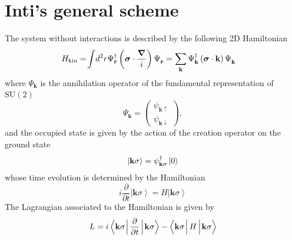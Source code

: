\documentclass[english,aps,prd,nofootinbib,twocolumn]{revtex4-1}
\begin{document}
\section{Inti's general scheme}
The system without interactions is described by the following 2D Hamiltonian
\begin{equation}
\begin{split}
H_{\mathrm{kin}} &= \!
\int \! d^{2}r 
\Psi_{\mathbf{r}}^{\textcolor{black}{\dagger}}
\left( 
\boldsymbol{\sigma}\cdot \frac{\boldsymbol{\nabla}}{i}
\right)
\Psi_{\mathbf{r}}^{\textcolor{white}{\dagger}}
=
\sum_{\mathbf{k}} 
\Psi_{\mathbf{k}}^{\textcolor{black}{\dagger}}
\left(
\boldsymbol{\sigma}\cdot \mathbf{k}
\right)
\Psi_{\mathbf{k}}^{\textcolor{white}{\dagger}}
\end{split}
\end{equation}
where $\Psi_{\mathbf{k}}$ is the annihilation operator of the fundamental representation of $\mathrm{SU(2)}$
\begin{equation}
\Psi_{\mathbf{k}} = 
\begin{pmatrix}
\psi_{\mathbf{k}\uparrow } \\
\psi_{\mathbf{k}\downarrow }
\end{pmatrix},
\end{equation}
and the occupied state is given by the action of the creation operator on the ground state
\begin{equation}
\left| 
\mathbf{k}\sigma 
\right\rangle = 
\psi_{\mathbf{k}\sigma}^{\textcolor{black}{\dagger}}
\left| 0 \right\rangle
\end{equation}
whose time evolution is determined by the Hamiltonian
\begin{equation}
i\frac{\partial}{\partial t}
\left| 
\mathbf{k}\sigma 
\right\rangle = 
H \left| 
\mathbf{k}\sigma 
\right\rangle 
\end{equation}
The Lagrangian associated to the Hamiltonian is given by
\begin{equation}
L = i
\left\langle 
\mathbf{k}\sigma \!\!
^{\textcolor{white}{\dagger}}_{\textcolor{white}{\dagger}}
\right|
\frac{\partial}{\partial t} 
\left| 
^{\textcolor{white}{\dagger}}_{\textcolor{white}{\dagger}}\!\!
\mathbf{k}\sigma 
\right\rangle -
\left\langle 
\mathbf{k}\sigma \!\!
^{\textcolor{white}{\dagger}}_{\textcolor{white}{\dagger}}
\right|
H
\left| 
^{\textcolor{white}{\dagger}}_{\textcolor{white}{\dagger}}\!\!
\mathbf{k}\sigma 
\right\rangle 
\end{equation}
\end{document}
